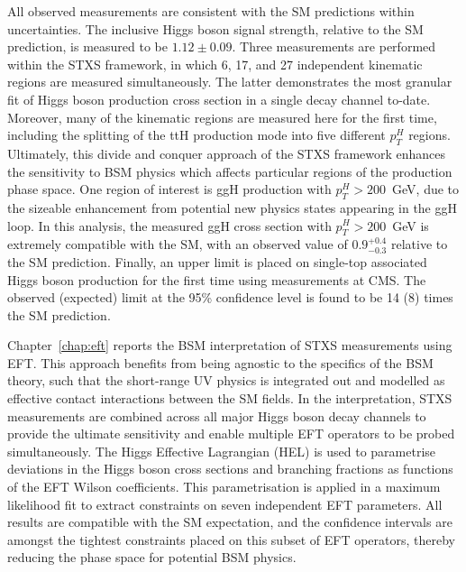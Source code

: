 All observed measurements are consistent with the SM predictions within uncertainties. The inclusive Higgs boson signal strength, relative to the SM prediction, is measured to be $1.12 \pm 0.09$. Three measurements are performed within the STXS framework, in which 6, 17, and 27 independent kinematic regions are measured simultaneously. The latter demonstrates the most granular fit of Higgs boson production cross section in a single decay channel to-date. Moreover, many of the kinematic regions are measured here for the first time, including the splitting of the ttH production mode into five different $p_T^H$ regions. Ultimately, this divide and conquer approach of the STXS framework enhances the sensitivity to BSM physics which affects particular regions of the production phase space. One region of interest is ggH production with $p_T^H>200$~GeV, due to the sizeable enhancement from potential new physics states appearing in the ggH loop. In this analysis, the measured ggH cross section with $p_T^H>200$~GeV is extremely compatible with the SM, with an observed value of $0.9^{+0.4}_{-0.3}$ relative to the SM prediction. Finally, an upper limit is placed on single-top associated Higgs boson production for the first time using \Hgg measurements at CMS. The observed (expected) limit at the 95\% confidence level is found to be 14 (8) times the SM prediction.

Chapter~\ref{chap:eft} reports the BSM interpretation of STXS measurements using EFT. This approach benefits from being agnostic to the specifics of the BSM theory, such that the short-range UV physics is integrated out and modelled as effective contact interactions between the SM fields. In the interpretation, STXS measurements are combined across all major Higgs boson decay channels to provide the ultimate sensitivity and enable multiple EFT operators to be probed simultaneously. The Higgs Effective Lagrangian (HEL) is used to parametrise deviations in the Higgs boson cross sections and branching fractions as functions of the EFT Wilson coefficients. This parametrisation is applied in a maximum likelihood fit to extract constraints on seven independent EFT parameters. All results are compatible with the SM expectation, and the confidence intervals are amongst the tightest constraints placed on this subset of EFT operators, thereby reducing the phase space for potential BSM physics.

